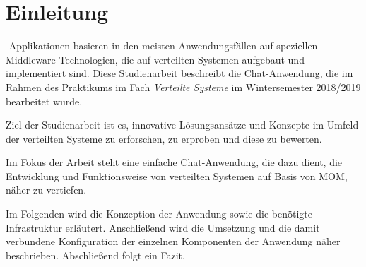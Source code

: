 \documentclass[10pt,journal,compsoc]{IEEEtran}
\begin{document}
\section{Einleitung}
\label{sec:Einleitung}
\fi




%
%
%
%
-Applikationen basieren in den meisten Anwendungsfällen auf speziellen Middleware Technologien, die auf verteilten Systemen aufgebaut und implementiert sind. Diese Studienarbeit beschreibt die Chat-Anwendung, die im Rahmen des Praktikums im Fach \textit{Verteilte Systeme} im Wintersemester 2018/2019 bearbeitet wurde. 

Ziel der Studienarbeit ist es, innovative Lösungsansätze und Konzepte im Umfeld der verteilten Systeme zu erforschen, zu erproben und diese zu bewerten. 

Im Fokus der Arbeit steht eine einfache Chat-Anwendung, die dazu dient, die Entwicklung und Funktionsweise von verteilten Systemen auf Basis von \ac{MOM}, näher zu vertiefen.

Im Folgenden wird die Konzeption der Anwendung sowie die benötigte Infrastruktur erläutert. Anschließend wird die Umsetzung und die damit verbundene Konfiguration der einzelnen Komponenten der Anwendung näher beschrieben. Abschließend folgt ein Fazit. 
\end{document}
